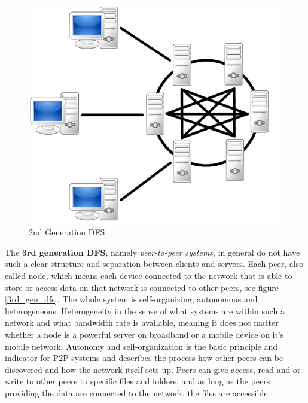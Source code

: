	\begin{figure}[H]
		\begin{center}
		\includegraphics[scale=0.25]{Talk5/2nd_gen_dfs.PNG}
		\end{center}
		\caption{2nd Generation DFS}
		\label{2nd_gen_dfs}
	\end{figure}
The \textbf{3rd generation DFS}, namely \textit{peer-to-peer systems}, in general do not have such a clear structure and separation between clients and servers. Each peer, also called node, which means each device connected to the network that is able to store or access data on that network is connected to other peers, see figure \ref{3rd_gen_dfs}. The whole system is self-organizing, autonomous and heterogeneous. Heterogeneity in the sense of what systems are within such a network and what bandwidth rate is available, meaning it does not matter whether a node is a powerful server on broadband or a mobile device on it's mobile network. Autonomy and self-organization is the basic principle and indicator for P2P systems and describes the process how other peers can be discovered and how the network itself sets up. Peers can give access, read and or write to other peers to specific files and folders, and as long as the peers providing the data are connected to the network, the files are accessible.
